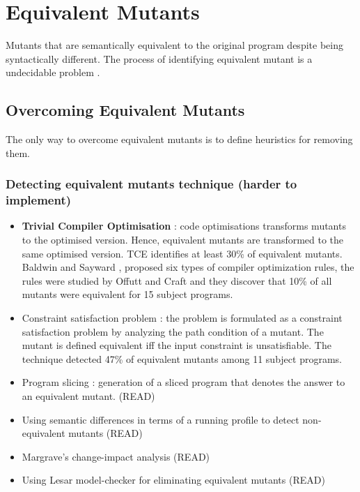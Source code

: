 
\section{Equivalent Mutants}
\label{sec:equivalent}

Mutants that are semantically equivalent to the original program despite being syntactically different. The process of identifying equivalent mutant is a undecidable problem \cite{madeyski2013overcoming}.

\subsection{Overcoming Equivalent Mutants} %
\label{sub:overcoming_equivalent_mutants}

The only way to overcome equivalent mutants is to define heuristics for removing them.

\subsubsection{Detecting equivalent mutants technique (harder to implement)}

\begin{itemize}
	\item \textbf{Trivial Compiler Optimisation} \cite{papadakis2015trivial, kintis2017detecting,papadakis2019mutation}: code optimisations transforms mutants to the optimised version. Hence, equivalent mutants are transformed to the same optimised version. TCE identifies at least 30\% of equivalent mutants.
	Baldwin and Sayward \cite{baldwin1979heuristics}, proposed six types of compiler optimization rules, the rules were studied by Offutt and Craft \cite{offutt1994using} and they discover that 10\% of all mutants were equivalent for 15 subject programs.
	\item Constraint satisfaction problem \cite{offutt1996detecting,offutt1997automatically}: the problem is formulated as a constraint satisfaction problem by analyzing the path condition of a mutant. The mutant is defined equivalent iff the input constraint is unsatisfiable. The technique detected 47\% of equivalent mutants among 11 subject programs.
	\item Program slicing \cite{voas1997software, hierons1999using, harman2001relationship}: generation of a sliced program that denotes the answer to an equivalent mutant. (READ)
	\item Using semantic differences in terms of a running profile to detect non-equivalent mutants \cite{ellims2007csaw} (READ)
	\item Margrave's change-impact analysis \cite{martin2007fault} (READ)
	\item Using Lesar model-checker for eliminating equivalent mutants \cite{du2008towards} (READ)
\end{itemize}

